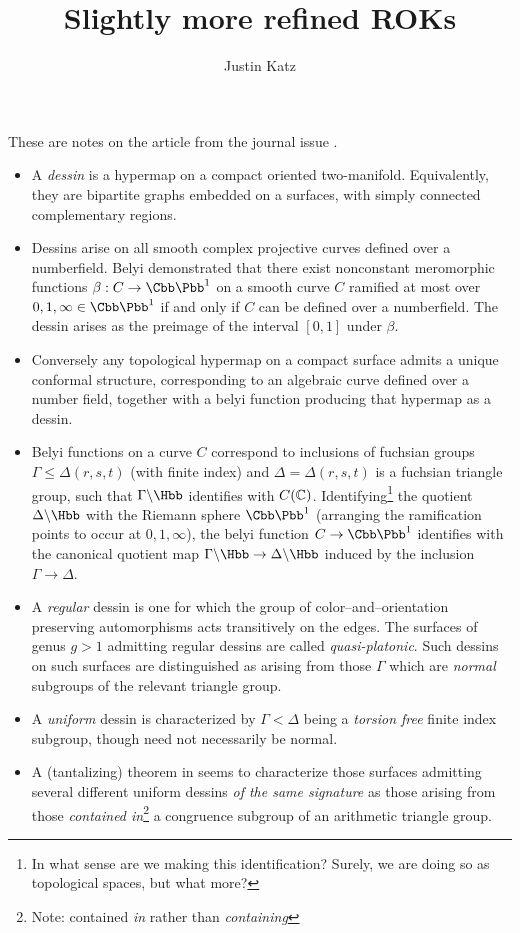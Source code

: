 \documentclass[11pt]{amsart}
\title{Slightly more refined ROKs}
\author{Justin Katz}
\newcommand{\CP}{\Cbb \Pbb}
\newcommand{\CPone}{\Cbb \Pbb^1}
\begin{document}
\maketitle
These are notes on the article \cite{girondoFieldsDefinitionUniform2014} from the journal issue
\cite{izquierdoRiemannKleinSurfaces2015}.

\begin{itemize}
  \item A \emph{dessin} is a hypermap on a compact oriented two-manifold. Equivalently, they are bipartite graphs embedded on a surfaces, with simply connected complementary regions.
  \item Dessins arise on all smooth complex projective curves defined over a numberfield. Belyi demonstrated that there exist nonconstant meromorphic functions $\beta: C\to \CP^1$ on a smooth curve $C$ ramified at most over $0,1,\infty \in \CP^1$ if and only if $C$ can be defined over a numberfield. The dessin arises as the preimage of the interval $[0,1]$ under $\beta$.
  \item Conversely any topological hypermap on a compact surface admits a unique conformal structure,   corresponding to an algebraic curve defined over a number field, together with a belyi function producing that hypermap as a dessin.
  \item Belyi functions on a curve $C$ correspond to inclusions of fuchsian groups $\Gamma \leq \Delta(r,s,t)$ (with finite index) and $\Delta=\Delta(r,s,t)$ is a fuchsian triangle group, such that $\Gamma \lmod \Hbb$ identifies with $C(\mathbb{C})$. Identifying\footnote{In what sense are we making this identification? Surely, we are doing so as topological spaces, but what more?} the quotient $\Delta \lmod \Hbb$ with the Riemann sphere $\CPone$ (arranging the ramification points to occur at $0,1,\infty$), the belyi function $C \to \CPone$ identifies with  the canonical quotient map $\Gamma \lmod \Hbb \to \Delta \lmod \Hbb$ induced by the inclusion $\Gamma \to \Delta$.
  \item A \emph{regular} dessin is one for which the group of color--and--orientation preserving automorphisms acts transitively on the edges. The surfaces of genus $g>1$ admitting regular dessins are called \emph{quasi-platonic}. Such dessins on such surfaces are distinguished as arising from those $\Gamma$ which are \emph{normal} subgroups of the relevant triangle group.
  \item A \emph{uniform} dessin is characterized by $\Gamma < \Delta$ being a \emph{torsion free} finite index subgroup, though need not necessarily be normal.
  \item A (tantalizing) theorem in \cite{girondoShimuraCurvesMany2012} seems to characterize those surfaces admitting several different uniform dessins \emph{of the same signature} as those arising from those \emph{contained in}\footnote{Note: contained \emph{in} rather than \emph{containing}} a congruence subgroup of an arithmetic triangle group.
\end{itemize}
\end{document}
